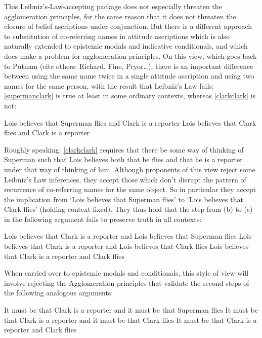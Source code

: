 \documentclass[If.tex]{subfiles}
\begin{document}
This Leibniz's-Law-accepting package does not especially threaten the agglomeration principles, for the same reason that it does not threaten the closure of belief ascriptions under conjunction.  But there is a different approach to substitution of co-referring names in attitude ascriptions which is also naturally extended to epistemic modals and indicative conditionals, and  which does make a problem for agglomeration principles.  On this view, which goes back to Putnam (cite others: Richard, Fine, Pryor…), there is an important difference between using the same name twice in a single attitude ascription and using two names for the same person, with the result that Leibniz's Law fails: \ref{supermanclark} is true at least in some ordinary contexts, whereas \ref{clarkclark} is not:
\begin{prop}
	\nitem
	\begin{prop}
		\aitem \label{supermanclark}
		Lois believes that Superman flies and Clark is a reporter
		\aitem \label{clarkclark}
		Lois believes that Clark flies and Clark is a reporter
	\end{prop}
\end{prop}
Roughly speaking: \ref{clarkclark} requires that there be some way of thinking of Superman such that Lois believes both that he flies and that he is a reporter under that way of thinking of him.  Although proponents of this view reject some Leibniz's Law inferences, they accept those which don't disrupt the pattern of recurrence of co-referring names for the same object.  So in particular they accept the implication from ‘Lois believes that Superman flies’ to ‘Lois believes that Clark flies’ (holding context fixed).  They thus hold that the step from (b) to (c) in the following argument fails to preserve truth in all contexts:
\begin{prop}
	\nitem
	\begin{prop}
		\aitem
		Lois believes that Clark is a reporter and Lois believes that Superman flies
		\aitem
		Lois believes that Clark is a reporter and Lois believes that Clark flies
		\aitem
		Lois believes that Clark is a reporter and Clark flies
	\end{prop}
\end{prop}	
When carried over to epistemic modals and conditionals, this style of view will involve rejecting the Agglomeration principles that validate the second steps of the following analogous arguments:
\begin{prop}
	\nitem
	\begin{prop}
		\aitem
		It must be that Clark is a reporter and it must be that Superman flies
		\aitem
		It must be that Clark is a reporter and it must be that Clark flies
		\aitem
		It must be that Clark is a reporter and Clark flies
	\end{prop}
\end{prop}	
\end{document}
